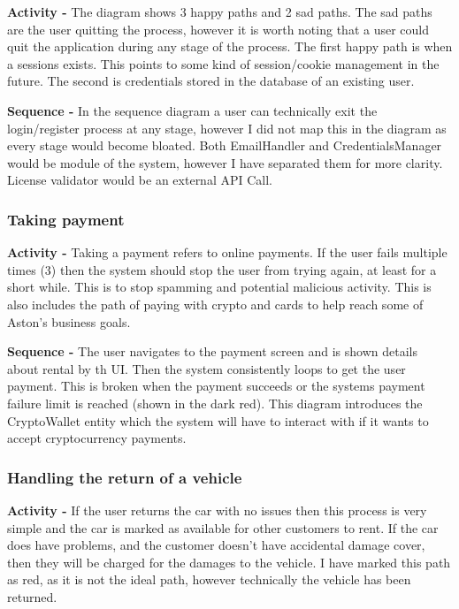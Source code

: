       \textbf{Activity -} The diagram shows 3 happy paths and 2 sad paths. The sad paths are the user quitting the process, however it is worth
      noting that a user could quit the application during any stage of the process. The first happy path is when a sessions exists.
      This points to some kind of session/cookie management in the future. The second is credentials stored in the database of an 
      existing user.

      \noindent\textbf{Sequence -} In the sequence diagram a user can technically exit the login/register process at any stage, however I did not map this in the 
      diagram as every stage would become bloated. Both EmailHandler and CredentialsManager would be module of the system, however I have separated them for 
      more clarity. License validator would be an external API Call. 

    \subsubsection{Taking payment}
      \textbf{Activity -} Taking a payment refers to online payments. If the user fails multiple times (3) then the system should stop
      the user from trying again, at least for a short while. This is to stop spamming and potential malicious activity.
      This is also includes the path of paying with crypto and cards to help reach some of Aston's business goals.

      \noindent\textbf{Sequence -} The user navigates to the payment screen and is shown details about rental by th UI. Then the system consistently
      loops to get the user payment. This is broken when the payment succeeds or the systems payment failure limit is reached (shown in the dark red). 
      This diagram introduces the CryptoWallet entity which the system will have to interact with if it wants to accept cryptocurrency payments.

    \subsubsection{Handling the return of a vehicle}
      \textbf{Activity -} If the user returns the car with no issues then this process is very simple and the car is marked as available for other 
      customers to rent. If the car does have problems, and the customer doesn't have accidental damage cover, then they will be charged for the 
      damages to the vehicle. I have marked this path as red, as it is not the ideal path, however technically the vehicle has been returned.

